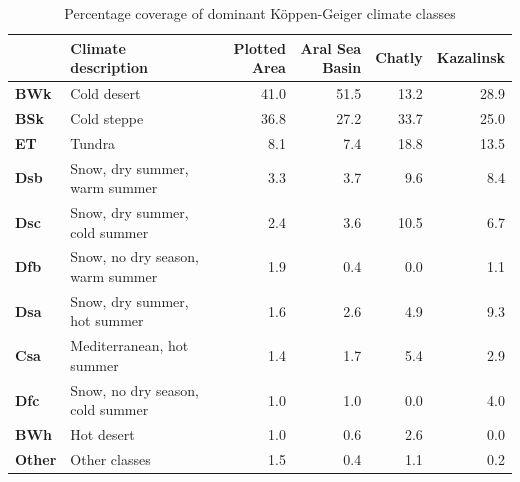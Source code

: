 \begin{table}
\caption{Percentage coverage of dominant Köppen-Geiger climate classes}
\label{tab:koppen_geiger_percent}
\begin{tabular}{llrrrr}
\toprule
 & Climate description & Plotted Area & Aral Sea Basin & Chatly & Kazalinsk \\
\midrule
\textbf{BWk} & Cold desert & 41.0 & 51.5 & 13.2 & 28.9 \\
\textbf{BSk} & Cold steppe & 36.8 & 27.2 & 33.7 & 25.0 \\
\textbf{ET} & Tundra & 8.1 & 7.4 & 18.8 & 13.5 \\
\textbf{Dsb} & Snow, dry summer, warm summer & 3.3 & 3.7 & 9.6 & 8.4 \\
\textbf{Dsc} & Snow, dry summer, cold summer & 2.4 & 3.6 & 10.5 & 6.7 \\
\textbf{Dfb} & Snow, no dry season, warm summer & 1.9 & 0.4 & 0.0 & 1.1 \\
\textbf{Dsa} & Snow, dry summer, hot summer & 1.6 & 2.6 & 4.9 & 9.3 \\
\textbf{Csa} & Mediterranean, hot summer & 1.4 & 1.7 & 5.4 & 2.9 \\
\textbf{Dfc} & Snow, no dry season, cold summer & 1.0 & 1.0 & 0.0 & 4.0 \\
\textbf{BWh} & Hot desert & 1.0 & 0.6 & 2.6 & 0.0 \\
\textbf{Other} & Other classes & 1.5 & 0.4 & 1.1 & 0.2 \\
\bottomrule
\end{tabular}
\end{table}
